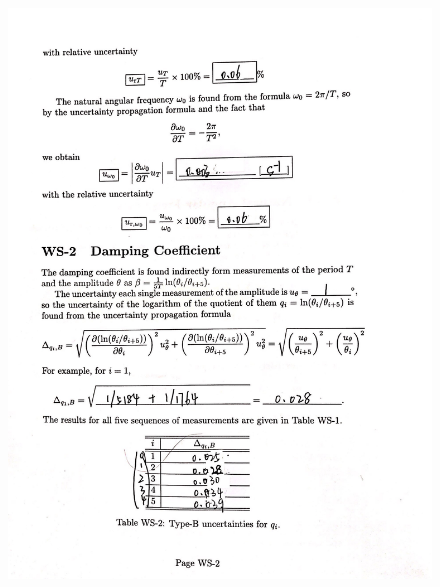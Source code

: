 \documentclass[12pt,a4paper]{article}
\begin{document}
\begin{figure}[t]
    \centering
    \includegraphics[scale=0.25]{newuncer2.jpeg}
\end{figure}
\end{document}
